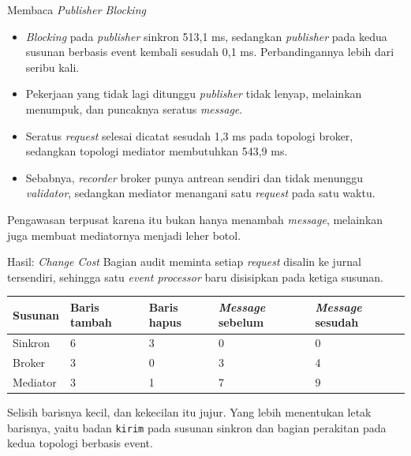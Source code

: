 \documentclass[aspectratio=169, table, 12pt]{beamer}
\begin{document}
\begin{frame}{{\Large Membaca \textit{Publisher Blocking}}}
  \vspace{10pt}
  \begin{itemize}\small
    \item \textit{Blocking} pada \textit{publisher} sinkron 513,1 ms, sedangkan \textit{publisher} pada kedua
          susunan berbasis event kembali sesudah 0,1 ms. Perbandingannya lebih
          dari seribu kali.
    \item Pekerjaan yang tidak lagi ditunggu \textit{publisher} tidak lenyap, melainkan
          menumpuk, dan puncaknya seratus \textit{message}.
    \item Seratus \textit{request} selesai dicatat sesudah 1,3 ms pada topologi
          broker, sedangkan topologi mediator membutuhkan 543,9 ms.
    \item Sebabnya, \textit{recorder} broker punya antrean sendiri dan tidak menunggu
          \textit{validator}, sedangkan mediator menangani satu \textit{request} pada satu
          waktu.
  \end{itemize}

  \vspace{10pt}
  {\small Pengawasan terpusat karena itu bukan hanya menambah \textit{message}, melainkan
  juga membuat mediatornya menjadi leher botol.}
\end{frame}

\begin{frame}{{\Large Hasil: \textit{Change Cost}}}
  \vspace{6pt}
  {\small Bagian audit meminta setiap \textit{request} disalin ke jurnal tersendiri,
  sehingga satu \textit{event processor} baru disisipkan pada ketiga susunan.}

  \vspace{6pt}
  \centering
  \small
  \begin{tabularx}{0.96\textwidth}{|l|l|l|l|X|}
    \hline
    \textbf{Susunan} & \textbf{Baris tambah} & \textbf{Baris hapus} & \textbf{\textit{Message} sebelum} & \textbf{\textit{Message} sesudah} \\
    \hline
    Sinkron & 6 & 3 & 0 & 0 \\
    \hline
    Broker & 3 & 0 & 3 & 4 \\
    \hline
    Mediator & 3 & 1 & 7 & 9 \\
    \hline
  \end{tabularx}

  \vspace{6pt}
  \raggedright
  {\small Selisih barisnya kecil, dan kekecilan itu jujur. Yang lebih
  menentukan letak barisnya, yaitu badan \texttt{kirim} pada susunan sinkron
  dan bagian perakitan pada kedua topologi berbasis event.}
\end{frame}
\end{document}
